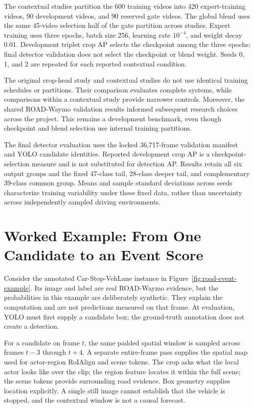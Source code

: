 The contextual studies partition the 600 training videos into 420 expert-training videos, 90 development videos, and 90 reserved gate videos. The global blend uses the same 45-video selection half of the gate partition across studies. Expert training uses three epochs, batch size 256, learning rate \(10^{-4}\), and weight decay 0.01. Development triplet crop AP selects the checkpoint among the three epochs; final detector validation does not select the checkpoint or blend weight. Seeds 0, 1, and 2 are repeated for each reported contextual condition.

The original crop-head study and contextual studies do not use identical training schedules or partitions. Their comparison evaluates complete systems, while comparisons within a contextual study provide narrower controls. Moreover, the shared ROAD-Waymo validation results informed subsequent research choices across the project. This remains a development benchmark, even though checkpoint and blend selection use internal training partitions.

The final detector evaluation uses the locked 36,717-frame validation manifest and YOLO candidate identities. Reported development crop AP is a checkpoint-selection measure and is not substituted for detection AP. Results retain all six output groups and the fixed 47-class tail, 28-class deeper tail, and complementary 39-class common group. Means and sample standard deviations across seeds characterize training variability under these fixed data, rather than uncertainty across independently sampled driving environments.

\section{Worked Example: From One Candidate to an Event Score}
\label{sec:worked-candidate}

Consider the annotated Car-Stop-VehLane instance in Figure~\ref{fig:road-event-example}. Its image and label are real ROAD-Waymo evidence, but the probabilities in this example are deliberately synthetic. They explain the computation and are not predictions measured on that frame. At evaluation, YOLO must first supply a candidate box; the ground-truth annotation does not create a detection.

For a candidate on frame \(t\), the same padded spatial window is sampled across frames \(t-3\) through \(t+4\). A separate entire-frame pass supplies the spatial map used for actor-region RoIAlign and scene tokens. The crop asks what the local actor looks like over the clip; the region feature locates it within the full scene; the scene tokens provide surrounding road evidence. Box geometry supplies location explicitly. A single still image cannot establish that the vehicle is stopped, and the contextual window is not a causal forecast.

